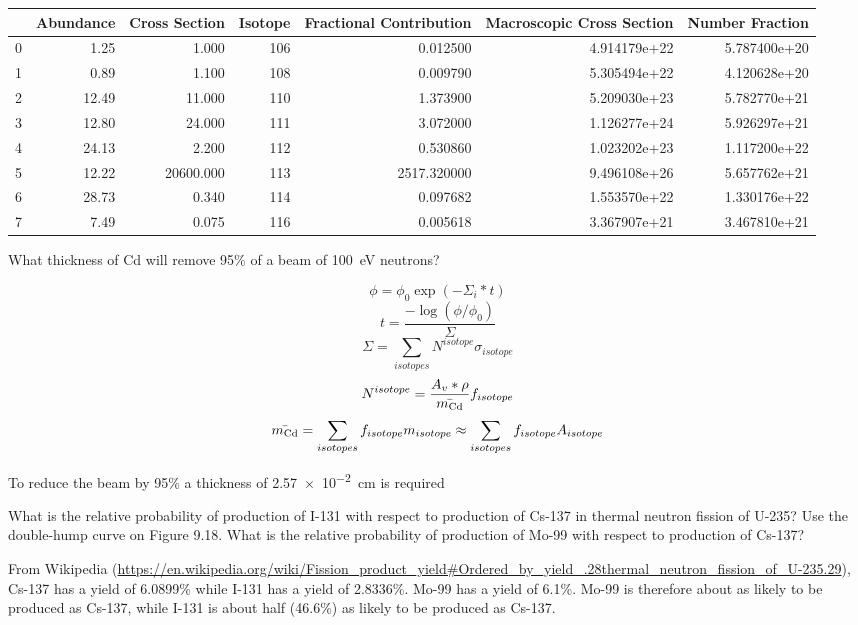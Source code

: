 \documentclass{hw}
\begin{document}
\begin{tabular}{lrrrrrr}
\toprule
{} &  Abundance &  Cross Section &  Isotope &  Fractional Contribution &  Macroscopic Cross Section &  Number Fraction \\
\midrule
0 &       1.25 &          1.000 &      106 &                               0.012500 &               4.914179e+22 &     5.787400e+20 \\
1 &       0.89 &          1.100 &      108 &                               0.009790 &               5.305494e+22 &     4.120628e+20 \\
2 &      12.49 &         11.000 &      110 &                               1.373900 &               5.209030e+23 &     5.782770e+21 \\
3 &      12.80 &         24.000 &      111 &                               3.072000 &               1.126277e+24 &     5.926297e+21 \\
4 &      24.13 &          2.200 &      112 &                               0.530860 &               1.023202e+23 &     1.117200e+22 \\
5 &      12.22 &      20600.000 &      113 &                            2517.320000 &               9.496108e+26 &     5.657762e+21 \\
6 &      28.73 &          0.340 &      114 &                               0.097682 &               1.553570e+22 &     1.330176e+22 \\
7 &       7.49 &          0.075 &      116 &                               0.005618 &               3.367907e+21 &     3.467810e+21 \\
\bottomrule
\end{tabular}


What thickness of Cd will remove 95\% of a beam of \SI{100}{\electronvolt} neutrons?

\solution
$$ \phi = \phi_0 \exp{\left(-\Sigma_i * t\right)} $$
$$ t = \frac{-\log \left(\phi / \phi_0 \right) }{\Sigma} $$
$$ \Sigma = \sum_{isotopes} N^{isotope} \sigma_{isotope} $$
$$ N^{isotope} = \frac{A_v * \rho}{\bar{m_{\ce{Cd}}}} f_{isotope} $$
$$ \bar{m_{\ce{Cd}}} = \sum_{isotopes} f_{isotope} m_{isotope} \approx \sum_{isotopes} f_{isotope} A_{isotope} $$

To reduce the beam by 95\% a thickness of \SI{2.57e-2}{\centi\meter} is required

\problem{}
What is the relative probability of production of I-131 with respect to production of Cs-137 in thermal neutron fission of U-235? Use the double-hump curve on Figure 9.18. What is the relative probability of production of Mo-99 with respect to production of Cs-137?

\solution
From Wikipedia (\url{https://en.wikipedia.org/wiki/Fission_product_yield#Ordered_by_yield_.28thermal_neutron_fission_of_U-235.29}), Cs-137 has a yield of 6.0899\% while I-131 has a yield of 2.8336\%. Mo-99 has a yield of 6.1\%. Mo-99 is therefore about as likely to be produced as Cs-137, while I-131 is about half (46.6\%) as likely to be produced as Cs-137.
\end{document}
